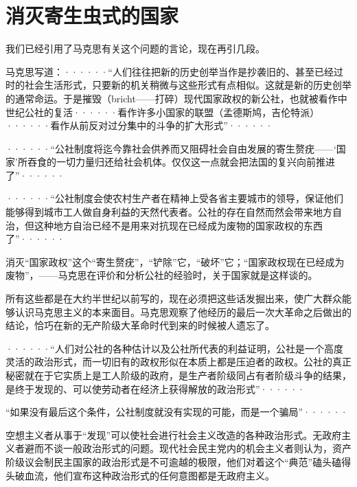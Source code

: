\chapter{消灭寄生虫式的国家} %


我们已经引用了马克思有关这个问题的言论，现在再引几段。

\pskip
\leftskip=10mm
\small

马克思写道：······“人们往往把新的历史创举当作是抄袭旧的、甚至已经过时的社会生活形式，只要新的机关稍微与这些形式有点相似。这就是新的历史创举的通常命运。于是摧毁（bricht——打碎）现代国家政权的新公社，也就被看作中世纪公社的复活······看作许多小国家的联盟（孟德斯鸠，吉伦特派）······看作从前反对过分集中的斗争的扩大形式”······

······“公社制度将迄今靠社会供养而又阻碍社会自由发展的寄生赘疣——‘国家’所吞食的一切力量归还给社会机体。仅仅这一点就会把法国的复兴向前推进了”······

······“公社制度会使农村生产者在精神上受各省主要城市的领导，保证他们能够得到城市工人做自身利益的天然代表者。公社的存在自然而然会带来地方自治，但这种地方自治已经不是用来对抗现在已经成为废物的国家政权的东西了”······

\normalsize
\leftskip=0mm
\pskip

消灭“国家政权”这个“寄生赘疣”，“铲除”它，“破坏”它；“国家政权现在已经成为废物”，——马克思在评价和分析公社的经验时，关于国家就是这样谈的。

所有这些都是在大约半世纪以前写的，现在必须把这些话发掘出来，使广大群众能够认识马克思主义的本来面目。马克思观察了他经历的最后一次大革命之后做出的结论，恰巧在新的无产阶级大革命时代到来的时候被人遗忘了。

\pskip
\leftskip=10mm
\small

······“人们对公社的各种估计以及公社所代表的利益证明，公社是一个高度灵活的政治形式，而一切旧有的政权形似在本质上都是压迫者的政权。公社的真正秘密就在于它实质上是{\kaishu 工人阶级的政府}，是生产者阶级同占有者阶级斗争的结果，是终于发现的、可以使劳动者在经济上获得解放的政治形式”······

“如果没有最后这个条件，公社制度就没有实现的可能，而是一个骗局”······

\normalsize
\leftskip=0mm
\pskip

空想主义者从事于“发现”可以使社会进行社会主义改造的各种政治形式。无政府主义者避而不谈一般政治形式的问题。现代社会民主党内的机会主义者则认为，资产阶级议会制民主国家的政治形式是不可逾越的极限，他们对着这个“典范”磕头磕得头破血流，他们宣布这种政治形式的任何意图都是无政府主义。

